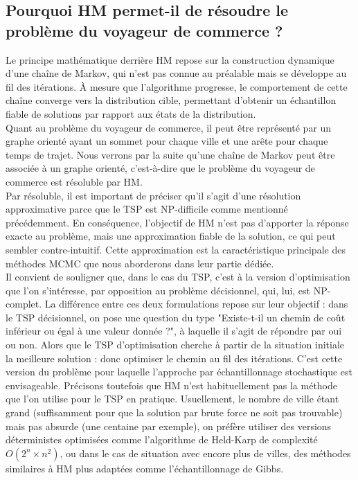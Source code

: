 \documentclass{article}
\begin{document}
\subsection{Pourquoi HM permet-il de résoudre le problème du voyageur de commerce ?}

Le principe mathématique derrière HM repose sur la construction dynamique d'une chaîne de Markov, qui n'est pas connue au préalable mais se développe au fil des itérations. À mesure que l'algorithme progresse, le comportement de cette chaîne converge vers la distribution cible, permettant d'obtenir un échantillon fiable de solutions par rapport aux états de la distribution. \\
Quant au problème du voyageur de commerce, il peut être représenté par un graphe orienté ayant un sommet pour chaque ville et une arête pour chaque temps de trajet. Nous verrons par la suite qu'une chaîne de Markov peut être associée à un graphe orienté, c'est-à-dire que le problème du voyageur de commerce est résoluble par HM. \\
Par résoluble, il est important de préciser qu'il s'agit d'une résolution approximative parce que le TSP est NP-difficile comme mentionné précédemment.
En conséquence, l'objectif de HM n'est pas d'apporter la réponse exacte au problème, mais une approximation fiable de la solution, ce qui peut sembler contre-intuitif. Cette approximation est la caractéristique principale des méthodes MCMC que nous aborderons dans leur partie dédiée. \\

Il convient de souligner que, dans le cas du TSP, c'est à la version d'optimisation que l'on s'intéresse, par opposition au problème décisionnel, qui, lui, est NP-complet. La différence entre ces deux formulations repose sur leur objectif : dans le TSP décisionnel, on pose une question du type "Existe-t-il un chemin de coût inférieur ou égal à une valeur donnée ?", à laquelle il s'agit de répondre par oui ou non.
Alors que le TSP d'optimisation cherche à partir de la situation initiale la meilleure solution : donc optimiser le chemin au fil des itérations. C'est cette version du problème pour laquelle l'approche par échantillonnage stochastique est envisageable.
Précisons toutefois que HM n'est habituellement pas la méthode que l'on utilise pour le TSP en pratique. Usuellement, le nombre de ville étant grand (suffisamment pour que la solution par brute force ne soit pas trouvable) mais pas absurde (une centaine par exemple), on préfère utiliser des versions déterministes optimisées comme l'algorithme de Held-Karp de complexité $O(2^n \times n^2)$, ou dans le cas de situation avec encore plus de villes, des méthodes similaires à HM plus adaptées comme l'échantillonnage de Gibbs.
\end{document}
